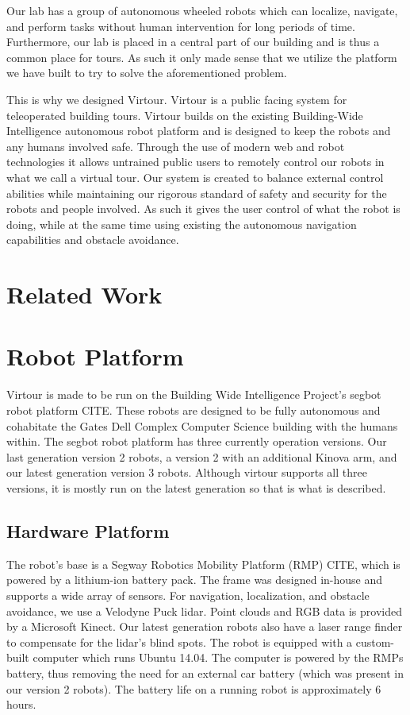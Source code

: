 \documentclass{sig-alternate-05-2015}
\begin{document}
Our lab has a group of autonomous wheeled robots which can localize, navigate,
and perform tasks without human intervention for long periods of time.
Furthermore, our lab is placed in a central part of our building and is thus a
common place for tours. As such it only made sense that we utilize the platform
we have built to try to solve the aforementioned problem.

This is why we designed Virtour. Virtour is a public facing system for
teleoperated building tours. Virtour builds on the existing Building-Wide
Intelligence autonomous robot platform and is designed to keep the robots and
any humans involved safe. Through the use of modern web and robot technologies
it allows untrained public users to remotely control our robots in what we call
a virtual tour. Our system is created to balance external control abilities
while maintaining our rigorous standard of safety and security for the robots
and people involved. As such it gives the user control of what the robot is
doing, while at the same time using existing the autonomous navigation
capabilities and obstacle avoidance.

\section{Related Work}

\section{Robot Platform}

Virtour is made to be run on the Building Wide Intelligence Project's segbot
robot platform {CITE}. These robots are designed to be fully autonomous and
cohabitate the Gates Dell Complex Computer Science building with the humans
within. The segbot robot platform has three currently operation versions. Our
last generation version 2 robots, a version 2 with an additional Kinova arm,
and our latest generation version 3 robots. Although virtour supports all three
versions, it is mostly run on the latest generation so that is what is
described.

\subsection{Hardware Platform}

The robot's base is a Segway Robotics Mobility Platform (RMP) {CITE}, which is
powered by a lithium-ion battery pack. The frame was designed in-house and
supports a wide array of sensors. For navigation, localization, and obstacle
avoidance, we use a Velodyne Puck lidar. Point clouds and RGB data is provided
by a Microsoft Kinect. Our latest generation robots also have a laser range
finder to compensate for the lidar's blind spots. The robot is equipped with a
custom-built computer which runs Ubuntu 14.04. The computer is powered by the
RMPs battery, thus removing the need for an external car battery (which was
present in our version 2 robots).  The battery life on a running robot is
approximately 6 hours.
\end{document}
